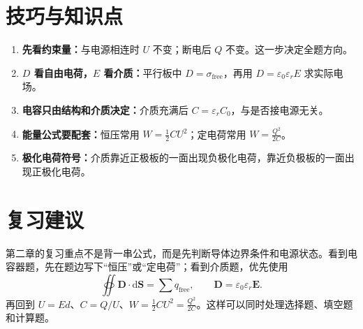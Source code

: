 \documentclass[11pt,a4paper]{ctexart}
\newcommand{\dd}{\mathrm{d}}
\begin{document}
\section*{技巧与知识点}

\begin{tipBox}
\begin{enumerate}
  \item \textbf{先看约束量：}与电源相连时 $U$ 不变；断电后 $Q$ 不变。这一步决定全题方向。
  \item \textbf{$D$ 看自由电荷，$E$ 看介质：}平行板中 $D=\sigma_{\text{free}}$，再用 $D=\varepsilon_0\varepsilon_rE$ 求实际电场。
  \item \textbf{电容只由结构和介质决定：}介质充满后 $C=\varepsilon_rC_0$，与是否接电源无关。
  \item \textbf{能量公式要配套：}恒压常用 $W=\frac12CU^2$；定电荷常用 $W=\frac{Q^2}{2C}$。
  \item \textbf{极化电荷符号：}介质靠近正极板的一面出现负极化电荷，靠近负极板的一面出现正极化电荷。
\end{enumerate}
\end{tipBox}

\section*{复习建议}

第二章的复习重点不是背一串公式，而是先判断导体边界条件和电源状态。看到电容器题，先在题边写下“恒压”或“定电荷”；看到介质题，优先使用
\[
  \oiint \bm D\cdot \dd\bm S=\sum q_{\text{free}},
  \qquad
  \bm D=\varepsilon_0\varepsilon_r\bm E.
\]
再回到 $U=Ed$、$C=Q/U$、$W=\frac12CU^2=\frac{Q^2}{2C}$。这样可以同时处理选择题、填空题和计算题。
\end{document}
